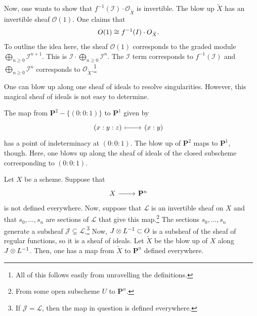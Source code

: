 \documentclass [11 pt, oneside] {article}
\begin{document}
Now, one wants to show that $f^{-1}(\mathscr{I}) \cdot \mathscr{O}_{\tilde X}$ is invertible.
The blow up $\tilde X$ has an invertible sheaf $\mathscr{O}(1)$. One claims that
\begin{align*}
	\relax{O}(1)\cong f ^{-1}(\relax{I}) \cdot \relax{O}_{\tilde X}.
\end{align*}
To outline the idea here, the sheaf $\mathscr{O}(1)$ corresponds to the graded module $\bigoplus_{n\ge 0}\mathscr{I}^{n+1}$. This is $\mathscr{I}\cdot \bigoplus_{n\ge 0}\mathscr{I}^n$. The $\mathscr{I}$ term corresponds to $f^{-1}(\mathscr{I})$ and $\bigoplus_{n\ge 0}\mathscr{I}^n$ corresponds to $\mathscr{O}_{\tilde X}$.\footnote{All of this follows easily from unravelling the definitions.}

\begin{remark}
	One can blow up along one sheaf of ideals to resolve singularities. However, this magical sheaf of ideals is not easy to determine.
\end{remark}

\begin{example}\label{}\text{}
The map from $\mathbf{P}^2-\{(0:0:1)\}$ to $\mathbf{P}^1$ given by
\[
\begin{tikzcd}
	(x:y:z)\ar[r,mapsto] &  (x:y)
\end{tikzcd}
\]
has a point of indeterminacy at $(0:0:1)$. The blow up of $\mathbf{P}^2$ maps to $\mathbf{P}^1$, though.
Here, one blows up along the sheaf of ideals of the closed subscheme corresponding to $(0:0:1)$.
\end{example}

Let $X$ be a scheme. Suppose that
\[
\begin{tikzcd}
	X\ar[r] & \mathbf{P}^n
\end{tikzcd}
\]
is not defined everywhere.
Now, suppose that $\mathscr{L}$ is an invertible sheaf on $X$ and that $s_0,\hdots,s_n$ are sections of $\mathscr{L}$ that give this map.\footnote{From some open subscheme $U$ to $\mathbf{P}^n$.} 
The sections $s_0,\hdots,s_n$ generate a subsheaf $\mathscr{J}\subsetneq \mathscr{L}$.\footnote{If $\mathscr{J}=\mathscr{L}$, then the map in question is defined everywhere.} 
Now, $\relax{J}\otimes \relax{L}^{-1}\subset \relax{O}$ is a subsheaf of the sheaf of regular functions, so it is a sheaf of ideals.
Let $\tilde X$ be the blow up of $X$ along $\relax{J}\otimes \relax{L}^{-1}$. Then, one has a map from $\tilde X$ to $\mathbf{P}^n$ defined everywhere.
\end{document}
